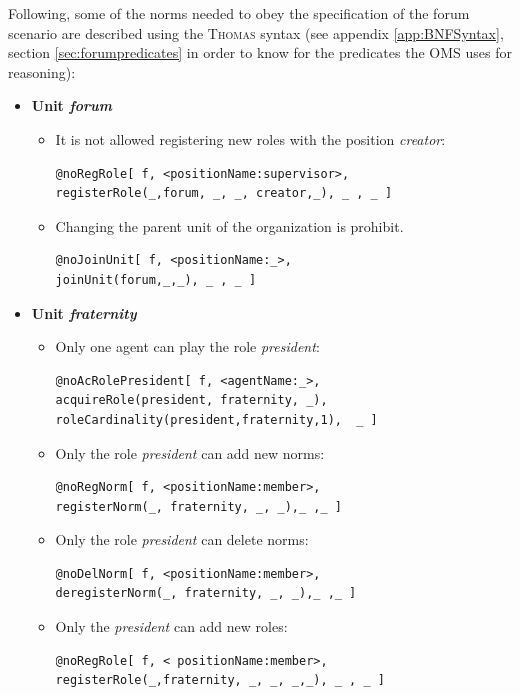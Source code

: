 Following, some of the norms needed to obey the specification of the forum scenario are described using the \textsc{Thomas} syntax (see appendix \ref{app:BNFSyntax}, section \ref{sec:forumpredicates} in order to know for the predicates  the OMS uses for reasoning):
\begin{itemize}
\item \textbf{Unit \textit{forum}}
\begin{itemize}
\item It is not allowed registering new roles with the position \textit{creator}:
\begin{verbatim}
@noRegRole[ f, <positionName:supervisor>, 
registerRole(_,forum, _, _, creator,_), _ , _ ] 
\end{verbatim}

\item Changing the parent unit of the organization is prohibit.  
\begin{verbatim}
@noJoinUnit[ f, <positionName:_>, 
joinUnit(forum,_,_), _ , _ ] 
\end{verbatim}

\end{itemize}

\item \textbf{Unit \textit{fraternity}}
\begin{itemize}
\item Only one agent can play the role \textit{president}:
\begin{verbatim}
@noAcRolePresident[ f, <agentName:_>, 
acquireRole(president, fraternity, _),
roleCardinality(president,fraternity,1),  _ ] 
\end{verbatim}

\item Only the role \textit{president} can add new norms:
\begin{verbatim}
@noRegNorm[ f, <positionName:member>, 
registerNorm(_, fraternity, _, _),_ ,_ ] 
\end{verbatim}

\item Only the role \textit{president} can delete norms:
\begin{verbatim}
@noDelNorm[ f, <positionName:member>, 
deregisterNorm(_, fraternity, _, _),_ ,_ ] 
\end{verbatim}

\item Only the  \textit{president} can add new roles:
\begin{verbatim}
@noRegRole[ f, < positionName:member>, 
registerRole(_,fraternity, _, _, _,_), _ , _ ] 
\end{verbatim}


\end{itemize}
\end{itemize}
